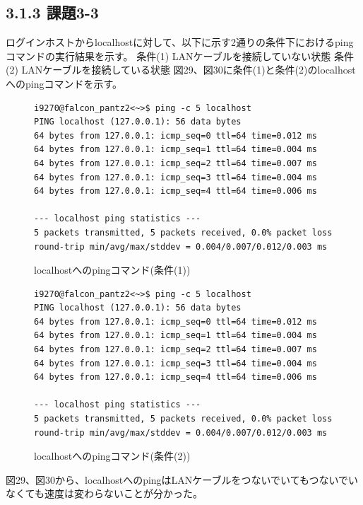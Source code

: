 \documentclass[12pt]{jreport}
\begin{document}
            \subsection*{3.1.3 課題3-3}
                ログインホストからlocalhostに対して、以下に示す2通りの条件下におけるpingコマンドの実行結果を示す。
                条件(1) LANケーブルを接続していない状態
                条件(2) LANケーブルを接続している状態
                図29、図30に条件(1)と条件(2)のlocalhostへのpingコマンドを示す。
                \begin{figure}[H]
                    \begin{center}
                        \begin{screen}
                            \begin{verbatim}
i9270@falcon_pantz2<~>$ ping -c 5 localhost
PING localhost (127.0.0.1): 56 data bytes
64 bytes from 127.0.0.1: icmp_seq=0 ttl=64 time=0.012 ms
64 bytes from 127.0.0.1: icmp_seq=1 ttl=64 time=0.004 ms
64 bytes from 127.0.0.1: icmp_seq=2 ttl=64 time=0.007 ms
64 bytes from 127.0.0.1: icmp_seq=3 ttl=64 time=0.004 ms
64 bytes from 127.0.0.1: icmp_seq=4 ttl=64 time=0.006 ms

--- localhost ping statistics ---
5 packets transmitted, 5 packets received, 0.0% packet loss
round-trip min/avg/max/stddev = 0.004/0.007/0.012/0.003 ms
                            \end{verbatim}
                        \end{screen}
                        \caption{localhostへのpingコマンド(条件(1))}
                        \label{29}
                    \end{center}
                \end{figure}
                \begin{figure}[H]
                    \begin{center}
                        \begin{screen}
                            \begin{verbatim}
i9270@falcon_pantz2<~>$ ping -c 5 localhost
PING localhost (127.0.0.1): 56 data bytes
64 bytes from 127.0.0.1: icmp_seq=0 ttl=64 time=0.012 ms
64 bytes from 127.0.0.1: icmp_seq=1 ttl=64 time=0.004 ms
64 bytes from 127.0.0.1: icmp_seq=2 ttl=64 time=0.007 ms
64 bytes from 127.0.0.1: icmp_seq=3 ttl=64 time=0.004 ms
64 bytes from 127.0.0.1: icmp_seq=4 ttl=64 time=0.006 ms

--- localhost ping statistics ---
5 packets transmitted, 5 packets received, 0.0% packet loss
round-trip min/avg/max/stddev = 0.004/0.007/0.012/0.003 ms
                            \end{verbatim}
                        \end{screen}
                        \caption{localhostへのpingコマンド(条件(2))}
                        \label{30}
                    \end{center}
                \end{figure}
                図29、図30から、localhostへのpingはLANケーブルをつないでいてもつないでいなくても速度は変わらないことが分かった。
\end{document}
